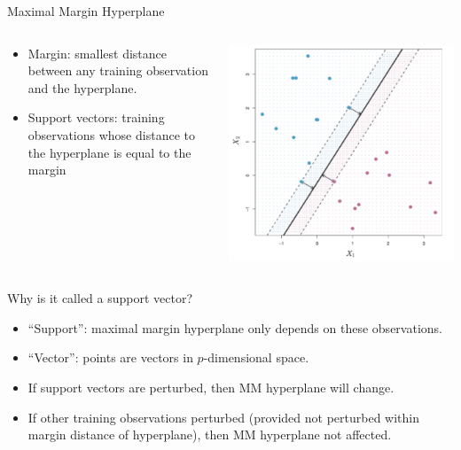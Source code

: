 \begin{frame}{Maximal Margin Hyperplane}
\begin{columns}
  \begin{column}{0.5\textwidth}
    \begin{itemize}
      \item Margin: smallest distance between any training observation and the hyperplane.
      \item Support vectors: training observations whose distance to the hyperplane is equal to the margin
    \end{itemize}
  \end{column}
  \begin{column}{0.5\textwidth}
    \includegraphics[width=\linewidth]{images/support-vector-machines/support-vector-machines-8.png}
  \end{column}
\end{columns}
\end{frame}


\begin{frame}{Why is it called a support vector?}
\begin{itemize}
  \item “Support”: maximal margin hyperplane only depends on these observations.
  \item “Vector”: points are vectors in $p$-dimensional space.
  \item If support vectors are perturbed, then MM hyperplane will change.
  \item If other training observations perturbed (provided not perturbed within margin distance of hyperplane), then MM hyperplane not affected.
\end{itemize}
\end{frame}


